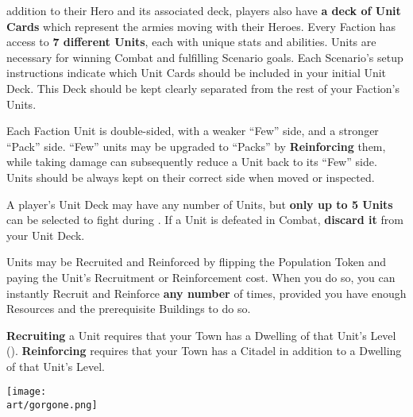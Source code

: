 
\begin{multicols*}{2}

 addition to their Hero and its associated deck, players also have \textbf{a deck of Unit Cards} which represent the armies moving with their Heroes.
Every Faction has access to \textbf{7 different Units}, each with unique stats and abilities.
Units are necessary for winning Combat and fulfilling Scenario goals.
Each Scenario's setup instructions indicate which Unit Cards should be included in your initial Unit Deck.
This Deck should be kept clearly separated from the rest of your Faction's Units.\par
Each Faction Unit is double-sided, with a weaker ``Few'' side, and a stronger ``Pack'' side.
``Few'' units may be upgraded to ``Packs'' by \textbf{Reinforcing} them, while taking damage can subsequently reduce a Unit back to its ``Few'' side.
Units should be always kept on their correct side when moved or inspected.\par
A player's Unit Deck may have any number of Units, but \textbf{only up to 5 Units} can be selected to fight during .
If a Unit is defeated in Combat, \textbf{discard it} from your Unit Deck.\par
Units may be Recruited and Reinforced by flipping the Population Token and paying the Unit's Recruitment  or Reinforcement  cost.
When you do so, you can instantly Recruit and Reinforce \textbf{any number} of times, provided you have enough Resources and the prerequisite Buildings to do so.\par
\textbf{Recruiting} a Unit requires that your Town has a Dwelling of that Unit's Level ().
\textbf{Reinforcing} requires that your Town has a Citadel in addition to a Dwelling of that Unit's Level.\par


\vspace*{\fill}
\iftoggle{printable}{}{\hspace{1em}}
{\texttt{[image: \\art/gorgone.png]}}

\clearpage

\end{multicols*}
